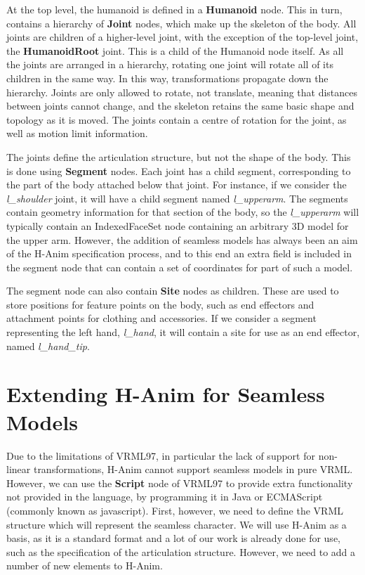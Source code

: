 \documentclass[10pt,oneside,fleqn,a4paper]{book}
\begin{document}
At the top level, the humanoid is defined in a {\bf Humanoid} node. This in turn, contains a hierarchy of {\bf Joint} nodes, which make up the skeleton of the body. All joints are children of a higher-level joint, with the exception of the top-level joint, the {\bf HumanoidRoot} joint. This is a child of the Humanoid node itself. As all the joints are arranged in a hierarchy, rotating one joint will rotate all of its children in the same way. In this way, transformations propagate down the hierarchy. Joints are only allowed to rotate, not translate, meaning that distances between joints cannot change, and the skeleton retains the same basic shape and topology as it is moved. The joints contain a centre of rotation for the joint, as well as motion limit information.

The joints define the articulation structure, but not the shape of the body. This is done using {\bf Segment} nodes. Each joint has a child segment, corresponding to the part of the body attached below that joint. For instance, if we consider the {\it l\_shoulder} joint, it will have a child segment named {\it l\_upperarm}. The segments contain geometry information for that section of the body, so the {\it l\_upperarm} will typically contain an IndexedFaceSet node containing an arbitrary 3D model for the upper arm. However, the addition of seamless models has always been an aim of the H-Anim specification process, and to this end an extra field is included in the segment node that can contain a set of coordinates for part of such a model.

The segment node can also contain {\bf Site} nodes as children. These are used to store positions for feature points on the body, such as end effectors and attachment points for clothing and accessories. If we consider a segment representing the left hand, {\it l\_hand}, it will contain a site for use as an end effector, named {\it l\_hand\_tip}.

\section{\label{sec:vrmlextendinghanim}Extending H-Anim for Seamless Models}
Due to the limitations of VRML97, in particular the lack of support for non-linear transformations, H-Anim cannot support seamless models in pure VRML. However, we can use the {\bf Script} node of VRML97 to provide extra functionality not provided in the language, by programming it in Java or ECMAScript (commonly known as javascript). First, however, we need to define the VRML structure which will represent the seamless character. We will use H-Anim as a basis, as it is a standard format and a lot of our work is already done for use, such as the specification of the articulation structure. However, we need to add a number of new elements to H-Anim.
\end{document}
